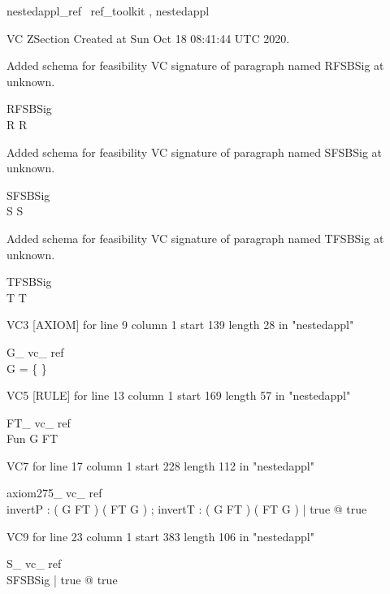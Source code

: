 \documentclass{article}
\begin{document}

\begin{zsection}	 \SECTION nestedappl\_ref \parents~ref\_toolkit , nestedappl
\end{zsection}

VC ZSection Created at Sun Oct 18 08:41:44 UTC 2020.


Added schema for feasibility VC signature of paragraph named RFSBSig at unknown.
\begin{schema}{RFSBSig}
\\
 R 
\where
 R
\end{schema}


Added schema for feasibility VC signature of paragraph named SFSBSig at unknown.
\begin{schema}{SFSBSig}
\\
 S 
\where
 S
\end{schema}


Added schema for feasibility VC signature of paragraph named TFSBSig at unknown.
\begin{schema}{TFSBSig}
\\
 T 
\where
 T
\end{schema}

VC3 [AXIOM] for line 9 column 1 start 139 length 28 in "nestedappl"
\begin{theorem}{ G\_ vc\_ ref}\\
 \lnot G = \{ \} \\

\end{theorem}

VC5 [RULE] for line 13 column 1 start 169 length 57 in "nestedappl"
\begin{theorem}{ FT\_ vc\_ ref}\\
 Fun \in G \inj FT \\

\end{theorem}

VC7 for line 17 column 1 start 228 length 112 in "nestedappl"
\begin{theorem}{ axiom275\_ vc\_ ref}\\
 \exists invertP : ( G \rel FT ) \pfun ( FT \rel G ) ; invertT : ( G \rel FT ) \fun ( FT \rel G ) | true @ true \\

\end{theorem}

VC9 for line 23 column 1 start 383 length 106 in "nestedappl"
\begin{theorem}{ S\_ vc\_ ref}\\
 \exists SFSBSig | true @ true \\

\end{theorem}
\end{document}
